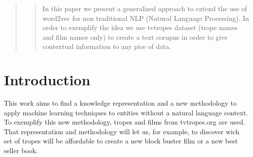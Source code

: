 \documentclass[letterpaper]{article}
\begin{document}
 
	\begin{abstract}
		\begin{quote}
			In this paper we present a generalized approach to extend the use of word2vec for non traditional NLP (Natural Language Processing). In order to exemplify the idea we use tvtropes dataset (trope names and film names only) to create a text corupus in order to give contextual information to any pice of data.
		\end{quote}
	\end{abstract}
	
	
	
	

\section{Introduction}

	
This work aims to find a knowledge representation and a new
methodology to apply machine learning techniques to entities without a
natural language context. %
To exemplify this new methodology, tropes and films from tvtropes.org
are used. That representation and methodology will let us, for
example, to discover wich set of tropes will be affordable to create a
new block buster film or a new best seller book.

\end{document}
